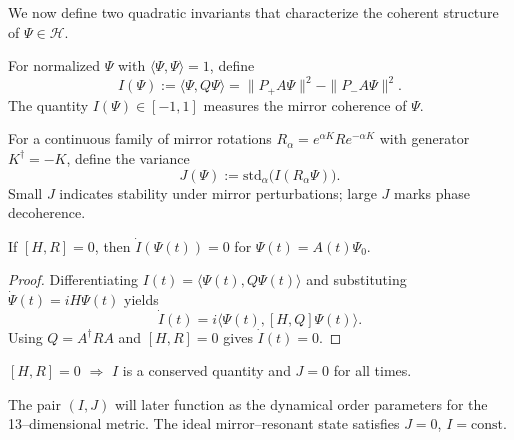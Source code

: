 We now define two quadratic invariants that characterize the coherent structure of $\Psi\in \mathcal{H}$.

\begin{definition}
For normalized $\Psi$ with $\langle\Psi,\Psi\rangle=1$, define
\[
I(\Psi) := \langle \Psi, Q \Psi \rangle
         = \| P_+ A\Psi \|^2 - \| P_- A\Psi \|^2.
\]
The quantity $I(\Psi)\in[-1,1]$ measures the mirror coherence of $\Psi$.
\end{definition}

\begin{definition}
For a continuous family of mirror rotations $R_\alpha = e^{\alpha K} R e^{-\alpha K}$
with generator $K^\dagger=-K$, define the variance
\[
J(\Psi) := \mathrm{std}_{\alpha}\big(I(R_\alpha \Psi)\big).
\]
Small $J$ indicates stability under mirror perturbations; large $J$ marks phase decoherence.
\end{definition}

\begin{lemma}
If $[H,R]=0$, then $\dot I(\Psi(t))=0$ for $\Psi(t)=A(t)\Psi_0$.
\end{lemma}

\begin{proof}
Differentiating $I(t)=\langle\Psi(t),Q\Psi(t)\rangle$
and substituting $\dot\Psi(t)=iH\Psi(t)$ yields
\[
\dot I(t) = i\langle\Psi(t),[H,Q]\Psi(t)\rangle.
\]
Using $Q=A^\dagger R A$ and $[H,R]=0$ gives $\dot I(t)=0$.
\end{proof}

\begin{corollary}
$[H,R]=0$ $\Rightarrow$ $I$ is a conserved quantity and $J=0$ for all times.
\end{corollary}

\begin{remark}
The pair $(I,J)$ will later function as the dynamical order parameters for the 13–dimensional metric.
The ideal mirror–resonant state satisfies $J=0$, $I=\mathrm{const}$.
\end{remark}


